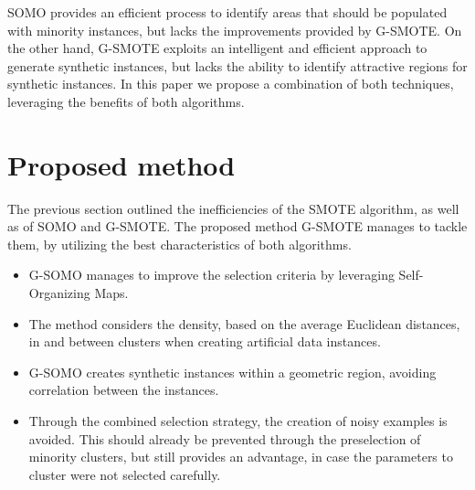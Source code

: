 \documentclass[parskip=full]{scrartcl}
\begin{document}
SOMO provides an efficient process to identify areas that should be populated with minority instances, but lacks 
the improvements provided by G-SMOTE. On the other hand, G-SMOTE exploits an intelligent and efficient approach
 to generate synthetic instances, but lacks the ability to identify attractive regions for synthetic instances.
  In this paper we propose a combination of both techniques, leveraging the benefits of both algorithms. 

\section{Proposed method}

The previous section outlined the inefficiencies of the SMOTE algorithm, as well as of SOMO and G-SMOTE. The proposed
 method G-SMOTE manages to tackle them, by utilizing the best characteristics of both algorithms. 

\begin{itemize} 
\item G-SOMO  manages to improve the selection criteria by leveraging Self-Organizing Maps.
\item The method considers the density, based on the average Euclidean distances, in and between clusters when 
	  creating artificial data instances.
\item G-SOMO creates synthetic instances within a geometric region, avoiding correlation between the instances.
\item Through the combined selection strategy, the creation of noisy examples is avoided. This should 
	  already be prevented through the preselection of minority clusters, but still provides an advantage, in case 
	  the parameters to cluster were not selected carefully.
\end{itemize}
\end{document}
